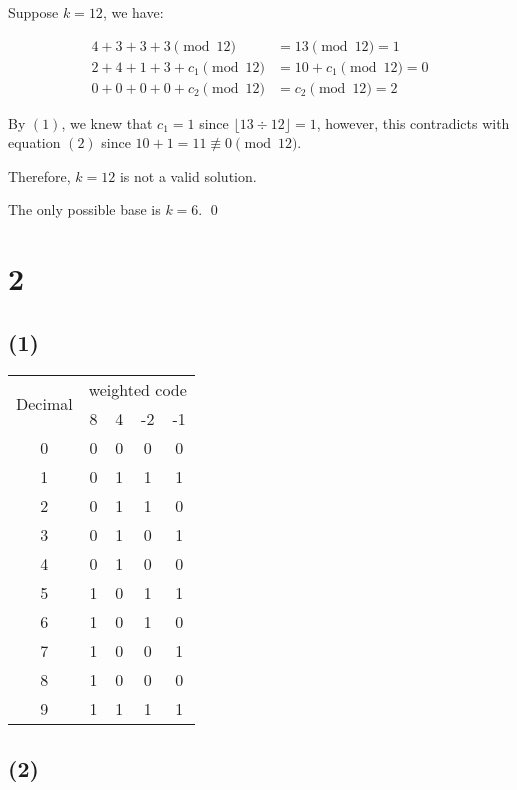 \documentclass{article}
\begin{document}
Suppose $k = 12$, we have:

\begin{align*}
    4 + 3 + 3 + 3 \pmod{12} &= 13 \pmod{12} = 1 \tag{1} \\
    2 + 4 + 1 + 3 + c_1 \pmod{12} &= 10 + c_1 \pmod{12} = 0 \tag{2} \\
    0 + 0 + 0 + 0 + c_2 \pmod{12} &= c_2 \pmod{12} = 2 \tag{3}
\end{align*}

By $(1)$, we knew that $c_1 = 1$ since $\lfloor 13 \div 12\rfloor = 1$,
however, this contradicts with equation $(2)$ since $10 + 1 = 11 \not\equiv 0 \pmod{12}$.
\bigskip

Therefore, $k = 12$ is not a valid solution.
\bigskip

The only possible base is $k = 6$. \qed
\newpage

\section*{2}

\subsection*{(1)}

\begin{center}
    \begin{tabular}{ |c||c|c|c|c| } 
        \hline
        \multirow{2}{*}{Decimal} & \multicolumn{4}{c|}{weighted code} \\
        \cline{2-5}
         & 8 & 4 & -2 & -1 \\
        \hline
        0 & 0 & 0 & 0 & 0 \\ 
        1 & 0 & 1 & 1 & 1 \\ 
        2 & 0 & 1 & 1 & 0 \\ 
        3 & 0 & 1 & 0 & 1 \\ 
        4 & 0 & 1 & 0 & 0 \\
        5 & 1 & 0 & 1 & 1 \\ 
        6 & 1 & 0 & 1 & 0 \\ 
        7 & 1 & 0 & 0 & 1 \\ 
        8 & 1 & 0 & 0 & 0 \\
        9 & 1 & 1 & 1 & 1 \\
        \hline
    \end{tabular}
\end{center}

\subsection*{(2)}
\end{document}
